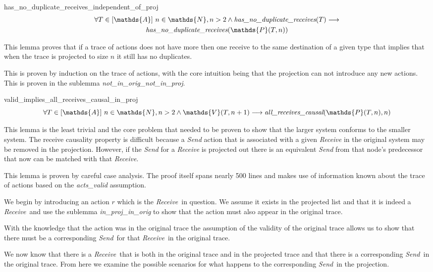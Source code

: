 \documentclass[runningheads]{llncs}
\newcommand{\send}{\emph{Send}}
\newcommand{\receive}{\emph{Receive}}
\newcommand{\action}{\mathds{A}}
\newcommand{\listaction}{[\action]}
\newcommand{\actsvalid}[2]{\mathds{V}(#1, #2)}
\newcommand{\projectsize}[2]{\mathds{P}(#1, #2)}
\newcommand{\hndr}[1]{\emph{has\_no\_duplicate\_receives}(#1)}
\newcommand{\allrc}[2]{\emph{all\_receives\_causal}(#1, #2)}
\begin{document}
\begin{lemma}{has\_no\_duplicate\_receives\_independent\_of\_proj}
\begin{multline*}
\forall T \in \listaction\ n \in \mathds{N}, n > 2 \wedge \hndr{T} \longrightarrow \\
\hndr{\projectsize{T}{n}}
\end{multline*}
\end{lemma}
This lemma proves that if a trace of actions does not have more then one receive to the same destination of a given type that implies that when the trace is projected to size $n$ it still has no duplicates.

This is proven by induction on the trace of actions, with the core intuition being that the projection can not introduce any new actions. This is proven in the sublemma \emph{not\_in\_orig\_not\_in\_proj}. 


\begin{lemma}{valid\_implies\_all\_receives\_causal\_in\_proj}
$$ \forall T \in \listaction\ n \in \mathds{N}, n > 2 \wedge \actsvalid{T}{n+1} \longrightarrow \allrc{\projectsize{T}{n}}{n} $$
\end{lemma}
This lemma is the least trivial and the core problem that needed to be proven to show that the larger system conforms to the smaller system. The receive causality property is difficult because a \emph{Send} action that is associated with a given \emph{Receive} in the original system may be removed in the projection. However, if the \emph{Send} for a \emph{Receive} is projected out there is an equivalent \emph{Send} from that node's predecessor that now can be matched with that \emph{Receive}. 

This lemma is proven by careful case analysis. The proof itself spans nearly 500 lines and makes use of information known about the trace of actions based on the \emph{acts\_valid} assumption. 

We begin by introducing an action $r$ which is the \receive\ in question. We assume it exists in the projected list and that it is indeed a \receive\ and use the sublemma \emph{in\_proj\_in\_orig} to show that the action must also appear in the original trace. 

With the knowledge that the action was in the original trace the assumption of the validity of the original trace allows us to show that there must be a corresponding \send\ for that \receive\ in the original trace. 

We now know that there is a \receive\ that is both in the original trace and in the projected trace and that there is a corresponding \send\ in the original trace. From here we examine the possible scenarios for what happens to the corresponding \send\ in the projection.
\end{document}
